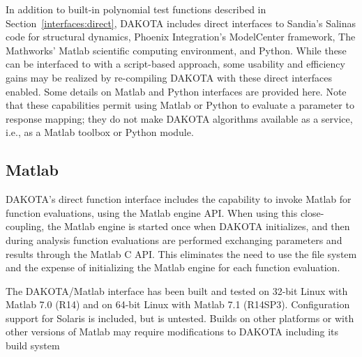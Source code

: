 In addition to built-in polynomial test functions described in
Section~\ref{interfaces:direct}, DAKOTA includes direct interfaces to
Sandia's Salinas code for structural dynamics, Phoenix Integration's
ModelCenter framework, The Mathworks' Matlab scientific computing
environment, and Python.  While these can be interfaced to with a
script-based approach, some usability and efficiency gains may be
realized by re-compiling DAKOTA with these direct interfaces enabled.
Some details on Matlab and Python interfaces are provided here.  Note
that these capabilities permit using Matlab or Python to evaluate a
parameter to response mapping; they do not make DAKOTA algorithms
available as a service, i.e., as a Matlab toolbox or Python module.

\subsection{Matlab}\label{advint:existingdirect:matlab} 

DAKOTA's direct function interface includes the capability to invoke
Matlab for function evaluations, using the Matlab engine API.  When
using this close-coupling, the Matlab engine is started once when
DAKOTA initializes, and then during analysis function evaluations are
performed exchanging parameters and results through the Matlab C API.
This eliminates the need to use the file system and the expense of
initializing the Matlab engine for each function evaluation.

The DAKOTA/Matlab interface has been built and tested on 32-bit Linux
with Matlab 7.0 (R14) and on 64-bit Linux with Matlab 7.1 (R14SP3).
Configuration support for Solaris is included, but is untested.
Builds on other platforms or with other versions of Matlab may require
modifications to DAKOTA including its build system

